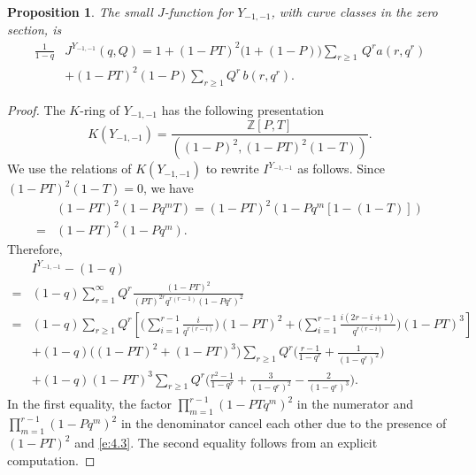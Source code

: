 \documentclass[11pt]{amsart}
\newtheorem{proposition}[theorem]{Proposition}
\newtheorem*{main theorem*}{Main Theorem}
\theoremstyle{remark}
\numberwithin{equation}{section}
\begin{document}
\begin{proposition} \label{prop_multicover_t=0}
The small $J$-function for %
$Y_{-1,-1}$, with curve classes in the zero section, is 
\begin{equation} \label{e:4.1}
\begin{split}
\frac{1}{1-q} & J^{Y_{-1,-1}}(q, Q) = 1 + (1-PT)^2\Big(1 +(1-P)\Big)\sum_{r \geq 1} \, Q^r a(r, q^r) %
\\
& + (1-PT)^2(1-P) \sum_{r\geq 1} Q^r \, b(r, q^r). %
\end{split} 
\end{equation}
\end{proposition}
\begin{proof} 
The $K$-ring of $Y_{-1,-1}$ has the following presentation
\[
 K(Y_{-1,-1}) = \frac{\mathbb{Z} [P, T]}{\left( (1-P)^2, (1-PT)^2(1-T) \right)}.
\]
We use the relations of $K(Y_{-1,-1})$ to rewrite $I^{Y_{-1,-1}}$ as follows. Since $(1-PT)^2(1-T) =0$, we have
\begin{equation} \label{e:4.2}
\begin{split}
   &(1-PT)^2 (1-Pq^m T) = (1-PT)^2 (1-Pq^m [1-(1-T)]) \\
   = &(1-PT)^2 (1-Pq^m).  
\end{split}
\end{equation}
Therefore,
\[
\begin{split}
    & I^{Y_{-1,-1}} - (1-q)\\
    = &(1-q) \sum_{r=1}^{\infty} Q^r \frac{(1-PT)^2} %
    {(PT)^{2r}q^{r(r-1)}(1-Pq^r)^2}
    \\
    = &(1-q)\sum_{r\geq 1}Q^r\left[ \Big( \sum_{i=1}^{r-1} \frac{i}{q^{r(r-i)}}\Big)(1-PT)^2  + \Big( \sum_{i=1}^{r-1} \frac{i(2r-i+1)}{q^{r(r-i)}} \Big) (1-PT)^3 \right]
    \\
    & + (1-q) \Big((1-PT)^2 +(1-PT)^3\Big)\sum_{r\geq 1} Q^r \Big( \frac{r-1}{1-q^r} + \frac{1}{(1-q^r)^2} \Big)
    \\
    & + (1-q)(1-PT)^3 \sum_{r\geq 1}Q^r\Big( \frac{r^2-1}{1-q^r} + \frac{3}{(1-q^r)^2} -\frac{2}{(1-q^r)^3} \Big).
\end{split}
\]
In the first equality, the factor $\prod_{m=1}^{r-1} (1-PTq^m)^2$ in the numerator and $\prod_{m=1}^{r-1}(1-Pq^m)^2$ in the denominator cancel each other due to the presence of $(1-PT)^2$ and \eqref{e:4.3}.
The second equality follows from an explicit computation.


\end{proof}
\end{document}
